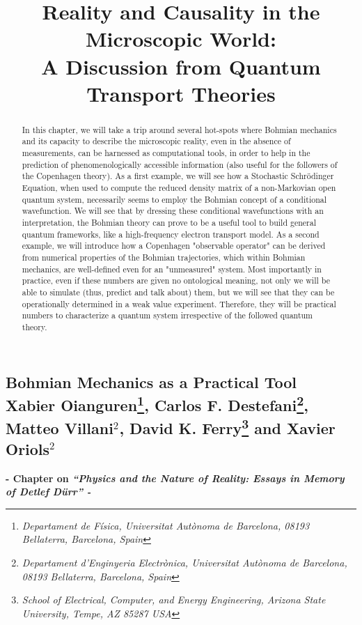 \documentclass[11pt, a4paper]{article} %
\title{\vspace{-2cm} {\bf Reality and Causality in the Microscopic World:\\ A Discussion from Quantum Transport Theories}
\vspace{-0.4cm}}
\date{\vspace{-11ex}}
\begin{document}
\begin{center}
\section*{ Bohmian Mechanics as a Practical Tool \vspace{0.3cm}\vspace{0.1cm}\\ \small Xabier Oianguren\footnote{\em Departament de Física, Universitat Autònoma de Barcelona, 08193 Bellaterra, Barcelona, Spain}, Carlos F. Destefani\footnote{\em Departament d’Enginyeria Electrònica, Universitat Autònoma de Barcelona, 08193 Bellaterra, Barcelona, Spain}, Matteo Villani$^2$, David K. Ferry\footnote{\em School of Electrical, Computer, and Energy Engineering, Arizona State University, Tempe,
AZ 85287 USA} and Xavier Oriols$^2$}

\vspace{-0.3cm}
{\bf \small - Chapter on {\em “Physics and the Nature of Reality: Essays in Memory of Detlef Dürr” - }}\vspace{-0.32cm}
\end{center}
\vspace{0.4cm}
\begin{abstract}
\hspace{5mm}In this chapter, we will take a trip around several hot-spots where Bohmian mechanics and its capacity to describe the microscopic reality, even in the absence of measurements, can be harnessed as computational tools, in order to help in the prediction of phenomenologically accessible information (also useful for the followers of the Copenhagen theory). As a first example, we will see how a Stochastic Schrödinger Equation, when used to compute the reduced density matrix of a non-Markovian open quantum system, necessarily seems to employ the Bohmian concept of a conditional wavefunction. We will see that by dressing these conditional wavefunctions with an interpretation, the Bohmian theory can prove to be a useful tool to build general quantum frameworks, like a high-frequency electron transport model. As a second example, we will introduce how a Copenhagen "observable operator" can be derived from numerical properties of the Bohmian trajectories, which within Bohmian mechanics, are well-defined even for an "unmeasured" system. Most importantly in practice, even if these numbers are given no ontological meaning, not only we will be able to simulate (thus, predict and talk about) them, but we will see that they can be operationally determined in a weak value experiment. Therefore, they will be practical numbers to characterize a quantum system irrespective of the followed quantum theory.
\end{abstract}
\end{document}

